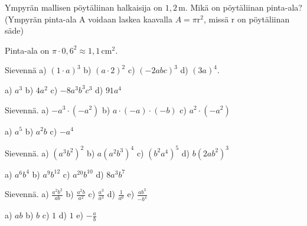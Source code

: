 \begin{tehtavasivu}
    \begin{tehtava}
        Ympyrän mallisen pöytäliinan halkaisija on $1,2$\,m.  Mikä on pöytäliinan pinta-ala? (Ympyrän pinta-ala A voidaan laskea kaavalla $A=\pi\text{r}^2$, missä r on pöytäliinan säde)
        \begin{vastaus}
        Pinta-ala on $\pi \cdot 0,6^2 \approx 1,1\,$cm$^2$.
        \end{vastaus}
\end{tehtava}

 \begin{tehtava}
        Sievennä 
        a) $(1\cdot a)^3$ 
        b) $(a\cdot 2)^2$ 
        c) $(-2abc)^3$ 
        d) $(3a)^4$.

        \begin{vastaus}
            a) $a^3$ 
            b) $4a^2$ 
            c) $-8a^3b^3c^3$ 
            d) $91a^4$
        \end{vastaus}
    \end{tehtava}
    \begin{tehtava}
        Sievennä. 
        a) $-a^3\cdot(-a^2)$ 
        b) $a\cdot(-a)\cdot(-b)$ 
        c) $a^2\cdot(-a^2)$
        
        \begin{vastaus}
            a) $a^5$ 
            b) $a^2b$ 
            c) $-a^4$
        \end{vastaus}
    \end{tehtava}

    \begin{tehtava}
        Sievennä. 
        a) $(a^3b^2)^2$ 
        b) $a(a^2b^3)^4$ 
        c) $(b^2a^4)^5$ 
        d) $b(2ab^2)^3$
        
        \begin{vastaus}
            a) $a^6b^4$ 
            b) $a^9b^{12}$ 
            c) $a^{20}b^{10}$ 
            d) $8a^3b^7$
        \end{vastaus}
    \end{tehtava}
      
    
    \begin{tehtava}
        Sievennä. 
        a) $\frac{a^2b^2}{ab}$ 
        b) $\frac{a^2b}{a^2}$ 
        c) $\frac{a^3}{a^3}$ 
        d) $\frac{1}{a^0}$ 
        e) $\frac{ab^3}{-b^4}$
        
        \begin{vastaus}
            a) $ab$ 
            b) $b$ 
            c) $1$ 
            d) $1$ 
            e) $-\frac{a}{b}$
        \end{vastaus}
    \end{tehtava}
    

\end{tehtavasivu}
